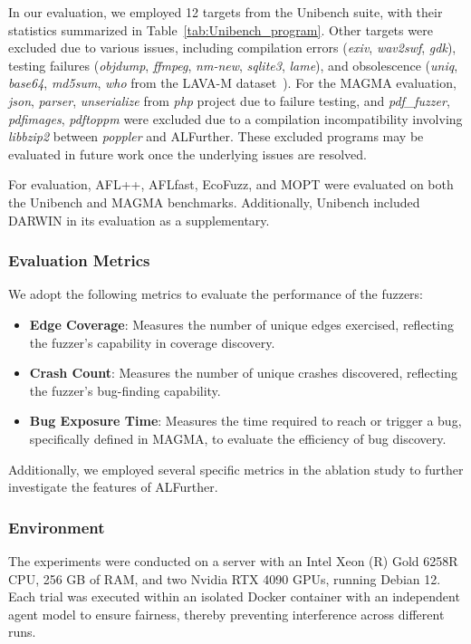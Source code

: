 \documentclass[lettersize,journal]{IEEEtran}
\begin{document}
In our evaluation, we employed 12 targets from the Unibench suite, with their statistics summarized in Table~\ref{tab:Unibench_program}. Other targets were excluded due to various issues, including compilation errors (\textit{exiv}, \textit{wav2swf}, \textit{gdk}), testing failures (\textit{objdump}, \textit{ffmpeg}, \textit{nm-new}, \textit{sqlite3}, \textit{lame}), and obsolescence (\textit{uniq}, \textit{base64}, \textit{md5sum}, \textit{who} from the LAVA-M dataset~\cite{dolan-gavittLAVALargescaleAutomated2016}). For the MAGMA evaluation, \textit{json}, \textit{parser}, \textit{unserialize} from \textit{php} project due to failure testing, and \textit{pdf\_fuzzer}, \textit{pdfimages}, \textit{pdftoppm} were excluded due to a compilation incompatibility involving \textit{libbzip2} between \textit{poppler} and ALFurther. These excluded programs may be evaluated in future work once the underlying issues are resolved.

For evaluation, AFL++, AFLfast, EcoFuzz, and MOPT were evaluated on both the Unibench and MAGMA benchmarks. Additionally, Unibench included DARWIN in its evaluation as a supplementary.

\subsubsection{Evaluation Metrics}
We adopt the following metrics to evaluate the performance of the fuzzers:
\begin{itemize}
	\item \textbf{Edge Coverage}: Measures the number of unique edges exercised, reflecting the fuzzer's capability in coverage discovery.
	\item \textbf{Crash Count}: Measures the number of unique crashes discovered, reflecting the fuzzer's bug-finding capability.
	\item \textbf{Bug Exposure Time}: Measures the time required to reach or trigger a bug, specifically defined in MAGMA, to evaluate the efficiency of bug discovery.
\end{itemize}
Additionally, we employed several specific metrics in the ablation study to further investigate the features of ALFurther.

\subsubsection{Environment}
The experiments were conducted on a server with an Intel Xeon (R) Gold 6258R CPU, 256 GB of RAM, and two Nvidia RTX 4090 GPUs, running Debian 12. Each trial was executed within an isolated Docker container with an independent agent model to ensure fairness, thereby preventing interference across different runs.
\end{document}
